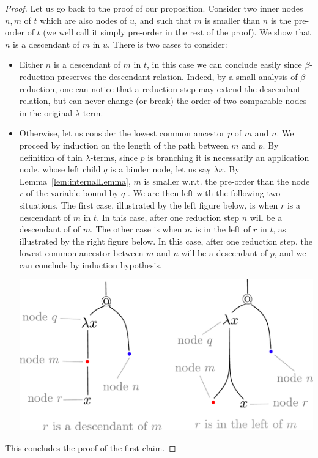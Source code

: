 \begin{proof}
Let us go back to the proof of our proposition. Consider two inner nodes $n, m$ of $t$ which are also nodes of $u$, and such that $m$ is smaller than $n$ is the pre-order of $t$ (we well call it simply pre-order in the rest of the proof). We show that $n$ is a descendant of $m$ in $u$. There is two cases to consider:
\begin{itemize}
\item Either $n$ is a descendant of $m$ in $t$, in this case we can conclude easily since $\beta$-reduction preserves the descendant relation. Indeed, by a small analysis of $\beta$-reduction, one can notice that a reduction step may extend the descendant relation, but can never change (or break) the order of two comparable nodes in the original $\lambda$-term.  
\item  Otherwise, let us consider the lowest common ancestor $p$ of $m$ and $n$. We proceed by induction on the length of the path between $m$ and $p$. By definition of thin $\lambda$-terms, since $p$ is branching it is necessarily an application node, whose left child $q$ is a binder node, let us say $\lambda x$. 
By Lemma~\ref{lem:internalLemma}, $m$ is smaller w.r.t. the pre-order than the node $r$ of the variable bound by $q$ . 
We are then left with the following two situations. The first case, illustrated by the left figure below, is when $r$ is a descendant of $m$ in $t$. In this case, after one reduction step $n$ will be a descendant of of $m$. The other case is when $m$ is in the left of $r$ in $t$, as illustrated by the right figure below. In this case, after one reduction step, the lowest common ancestor between $m$ and $n$ will be a descendant of $p$, and we can conclude by induction hypothesis. 
\begin{center}
\includegraphics[scale=.3]{pictures/cases-lemma}
\end{center}
\end{itemize}
This concludes the proof of the first claim.
\end{proof}


